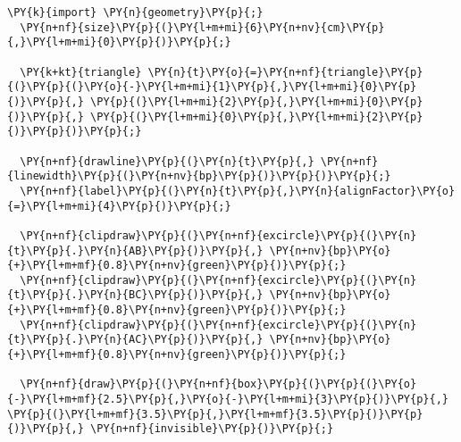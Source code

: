 \begin{Verbatim}[commandchars=\\\{\}]
  \PY{k}{import} \PY{n}{geometry}\PY{p}{;}
  \PY{n+nf}{size}\PY{p}{(}\PY{l+m+mi}{6}\PY{n+nv}{cm}\PY{p}{,}\PY{l+m+mi}{0}\PY{p}{)}\PY{p}{;}

  \PY{k+kt}{triangle} \PY{n}{t}\PY{o}{=}\PY{n+nf}{triangle}\PY{p}{(}\PY{p}{(}\PY{o}{-}\PY{l+m+mi}{1}\PY{p}{,}\PY{l+m+mi}{0}\PY{p}{)}\PY{p}{,} \PY{p}{(}\PY{l+m+mi}{2}\PY{p}{,}\PY{l+m+mi}{0}\PY{p}{)}\PY{p}{,} \PY{p}{(}\PY{l+m+mi}{0}\PY{p}{,}\PY{l+m+mi}{2}\PY{p}{)}\PY{p}{)}\PY{p}{;}

  \PY{n+nf}{drawline}\PY{p}{(}\PY{n}{t}\PY{p}{,} \PY{n+nf}{linewidth}\PY{p}{(}\PY{n+nv}{bp}\PY{p}{)}\PY{p}{)}\PY{p}{;}
  \PY{n+nf}{label}\PY{p}{(}\PY{n}{t}\PY{p}{,}\PY{n}{alignFactor}\PY{o}{=}\PY{l+m+mi}{4}\PY{p}{)}\PY{p}{;}

  \PY{n+nf}{clipdraw}\PY{p}{(}\PY{n+nf}{excircle}\PY{p}{(}\PY{n}{t}\PY{p}{.}\PY{n}{AB}\PY{p}{)}\PY{p}{,} \PY{n+nv}{bp}\PY{o}{+}\PY{l+m+mf}{0.8}\PY{n+nv}{green}\PY{p}{)}\PY{p}{;}
  \PY{n+nf}{clipdraw}\PY{p}{(}\PY{n+nf}{excircle}\PY{p}{(}\PY{n}{t}\PY{p}{.}\PY{n}{BC}\PY{p}{)}\PY{p}{,} \PY{n+nv}{bp}\PY{o}{+}\PY{l+m+mf}{0.8}\PY{n+nv}{green}\PY{p}{)}\PY{p}{;}
  \PY{n+nf}{clipdraw}\PY{p}{(}\PY{n+nf}{excircle}\PY{p}{(}\PY{n}{t}\PY{p}{.}\PY{n}{AC}\PY{p}{)}\PY{p}{,} \PY{n+nv}{bp}\PY{o}{+}\PY{l+m+mf}{0.8}\PY{n+nv}{green}\PY{p}{)}\PY{p}{;}

  \PY{n+nf}{draw}\PY{p}{(}\PY{n+nf}{box}\PY{p}{(}\PY{p}{(}\PY{o}{-}\PY{l+m+mf}{2.5}\PY{p}{,}\PY{o}{-}\PY{l+m+mi}{3}\PY{p}{)}\PY{p}{,} \PY{p}{(}\PY{l+m+mf}{3.5}\PY{p}{,}\PY{l+m+mf}{3.5}\PY{p}{)}\PY{p}{)}\PY{p}{,} \PY{n+nf}{invisible}\PY{p}{)}\PY{p}{;}
\end{Verbatim}
